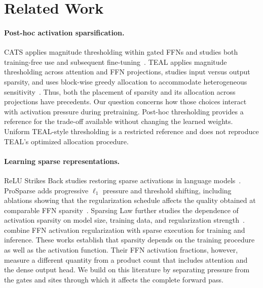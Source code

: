 \section{Related Work}
\label{sec:related-work}

\paragraph{Post-hoc activation sparsification.}
CATS applies magnitude thresholding within gated FFNs and studies both
training-free use and subsequent fine-tuning~\citep{lee2024cats}.
TEAL applies magnitude thresholding across attention and FFN projections,
studies input versus output sparsity, and uses block-wise greedy allocation to
accommodate heterogeneous sensitivity~\citep{liu2024teal}. Thus, both the
placement of sparsity and its allocation across projections have precedents.
Our question concerns how those choices interact with activation pressure
during pretraining. Post-hoc thresholding provides a reference for the
trade-off available without changing the learned weights. Uniform
TEAL-style thresholding is a restricted reference and does not reproduce
TEAL's optimized allocation procedure.

\paragraph{Learning sparse representations.}
ReLU Strikes Back studies restoring sparse activations in language
models~\citep{mirzadeh2023relu}. ProSparse adds progressive $\ell_1$ pressure
and threshold shifting, including ablations showing that the regularization
schedule affects the quality obtained at comparable FFN
sparsity~\citep{song2024prosparse}. Sparsing Law further studies the dependence
of activation sparsity on model size, training data, and regularization
strength~\citep{luo2025sparsing}.
\citet{cetin2026sparser} combine FFN activation regularization with sparse
execution for training and inference. These works establish that sparsity
depends on the training procedure as well as the activation function. Their
FFN activation fractions, however, measure a different quantity from a product
count that includes attention and the dense output head. We build on this
literature by separating pressure from the gates and sites through which it
affects the complete forward pass.

